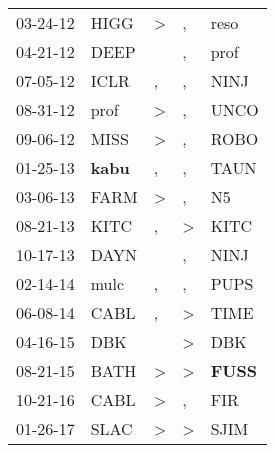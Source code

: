 \begin{supertabular}{p{0.07\textwidth}p{0.06\textwidth}p{0.02\textwidth}p{0.02\textwidth}p{0.06\textwidth}}
          03-24-12\textsuperscript{} &           HIGG\textsuperscript{} &  \textgreater &             , &           reso\textsuperscript{} \\
          04-21-12\textsuperscript{} &           DEEP\textsuperscript{} &               &             , &           prof\textsuperscript{} \\
          07-05-12\textsuperscript{} &           ICLR\textsuperscript{} &             , &             , &           NINJ\textsuperscript{} \\
          08-31-12\textsuperscript{} &           prof\textsuperscript{} &  \textgreater &             , &           UNCO\textsuperscript{} \\
          09-06-12\textsuperscript{} &           MISS\textsuperscript{} &  \textgreater &             , &           ROBO\textsuperscript{} \\
          01-25-13\textsuperscript{} &  \textbf{kabu\textsuperscript{}} &             , &             , &           TAUN\textsuperscript{} \\
          03-06-13\textsuperscript{} &           FARM\textsuperscript{} &  \textgreater &             , &             N5\textsuperscript{} \\
          08-21-13\textsuperscript{} &           KITC\textsuperscript{} &             , &  \textgreater &           KITC\textsuperscript{} \\
          10-17-13\textsuperscript{} &           DAYN\textsuperscript{} &               &             , &           NINJ\textsuperscript{} \\
          02-14-14\textsuperscript{} &           mulc\textsuperscript{} &             , &             , &           PUPS\textsuperscript{} \\
          06-08-14\textsuperscript{} &           CABL\textsuperscript{} &             , &  \textgreater &           TIME\textsuperscript{} \\
          04-16-15\textsuperscript{} &            DBK\textsuperscript{} &               &  \textgreater &            DBK\textsuperscript{} \\
          08-21-15\textsuperscript{} &           BATH\textsuperscript{} &  \textgreater &  \textgreater &  \textbf{FUSS\textsuperscript{}} \\
          10-21-16\textsuperscript{} &           CABL\textsuperscript{} &  \textgreater &             , &            FIR\textsuperscript{} \\
          01-26-17\textsuperscript{} &           SLAC\textsuperscript{} &  \textgreater &  \textgreater &           SJIM\textsuperscript{} \\

\end{supertabular}
